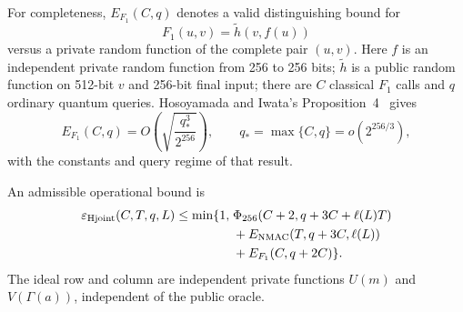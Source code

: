 For completeness, $E_{F_1}(C,q)$ denotes a valid distinguishing bound for
\[
 F_1(u,v)=\widetilde h(v,f(u))
\]
versus a private random function of the complete pair $(u,v)$.
Here $f$ is an independent private random function from 256 to 256 bits;
$\widetilde h$ is a public random function on 512-bit $v$ and 256-bit final
input; there are $C$ classical $F_1$ calls and $q$ ordinary quantum queries.
Hosoyamada and Iwata's Proposition~4~\cite{hmacqrom2021} gives
\[
 E_{F_1}(C,q)=
 O\!\left(\sqrt{\frac{q_*^3}{2^{256}}}\right),
 \qquad q_*=\max\{C,q\}=o(2^{256/3}),
\]
with the constants and query regime of that result.

\begin{lemma}
\label{lem:appendix-joint-hmac}
An admissible operational bound is
\begin{equation}
\begin{split}
 \varepsilon_{\rm Hjoint}(C,T,q,L)\le\min\{1,\;&
 \Phi_{256}(C+2,q+3C+\ell(L)T)\\
 &+E_{\rm NMAC}(T,q+3C,\ell(L))\\
 &+E_{F_1}(C,q+2C)\}.
\end{split}
 \label{eq:appendix-joint-hmac}
\end{equation}
The ideal row and column are independent private functions
$U(m)$ and $V(\Gamma(a))$, independent of the public oracle.
\end{lemma}

